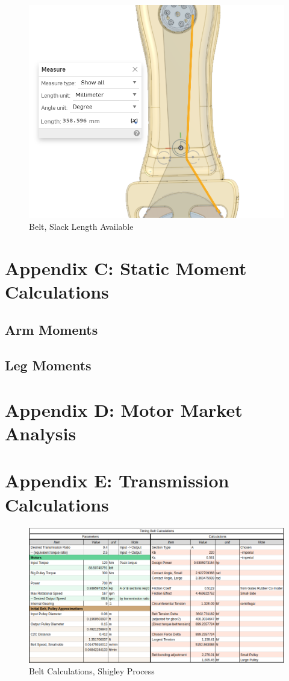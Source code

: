 \documentclass{article}
\begin{document}
\begin{figure}
    \centering
    \includegraphics[width=0.5\linewidth]{assets/BoMPurchasedParts/MOHRA_BeltLength_Slack.png}
    \caption{Belt, Slack Length Available}
    \label{fig:enter-label}
\end{figure}

\newpage 

\section{Appendix C: Static Moment Calculations}

\subsection{Arm Moments}


\subsection{Leg Moments}


\newpage

\section{Appendix D: Motor Market Analysis}



\newpage 

\section{Appendix E: Transmission Calculations}

\newpage 

\begin{figure}
    \centering
    \includegraphics[width=0.5\linewidth]{assets/Calcs/Calculations_BeltRequirements.png}
    \caption{Belt Calculations, Shigley Process}
    \label{fig:enter-label}
\end{figure}
\end{document}

